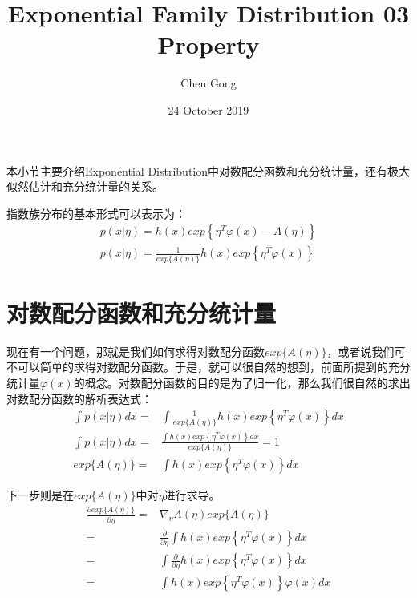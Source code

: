 \documentclass[a4paper]{article}
\title{Exponential Family Distribution 03 Property}
\author{Chen Gong}
\date{24 October 2019}
\begin{document}
\maketitle

本小节主要介绍Exponential Distribution中对数配分函数和充分统计量，还有极大似然估计和充分统计量的关系。

指数族分布的基本形式可以表示为：
\begin{gather}
    p(x|\eta) = h(x)exp\left\{ \eta^T\varphi(x)-A(\eta) \right\} \\
    p(x|\eta) = \frac{1}{exp \{A(\eta)\}} h(x)exp\left\{ \eta^T\varphi(x)\right\}
\end{gather}
    

\section{对数配分函数和充分统计量}
现在有一个问题，那就是我们如何求得对数配分函数$exp\{ A(\eta) \}$，或者说我们可不可以简单的求得对数配分函数。于是，就可以很自然的想到，前面所提到的充分统计量$\varphi(x)$的概念。对数配分函数的目的是为了归一化，那么我们很自然的求出对数配分函数的解析表达式：
\begin{equation}
    \begin{split}
        \int p(x|\eta) dx = & 
        \int \frac{1}{exp \{A(\eta)\}} h(x)exp\left\{ \eta^T\varphi(x)\right\} dx\\
        \int p(x|\eta) dx = & \frac{\int h(x)exp\left\{ \eta^T\varphi(x)\right\} dx}{exp \{A(\eta)\}} = 1 \\
        exp \{A(\eta)\} = & \int h(x)exp\left\{ \eta^T\varphi(x)\right\} dx 
    \end{split}
\end{equation}

下一步则是在$exp \{A(\eta)\}$中对$\eta$进行求导。
\begin{equation}
    \begin{split}
        \frac{\partial exp \{A(\eta)\}}{\partial \eta} = & \nabla_\eta A(\eta)exp \{A(\eta)\}  \\
        = & \frac{\partial}{\partial \eta}\int h(x)exp\left\{ \eta^T\varphi(x)\right\} dx \\
        = & \int \frac{\partial}{\partial \eta} h(x)exp\left\{ \eta^T\varphi(x)\right\} dx \\
        = & \int h(x)exp\left\{ \eta^T\varphi(x)\right\}\varphi(x) dx \\
    \end{split}
\end{equation}
\end{document}
